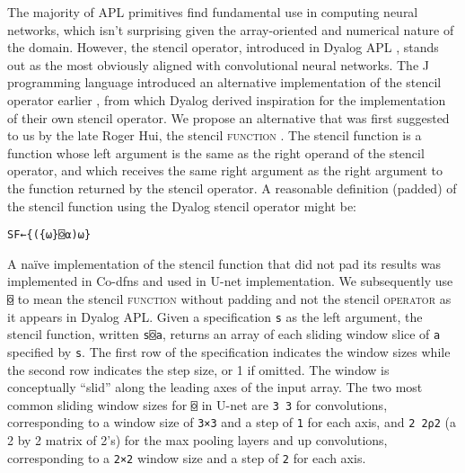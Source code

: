 \documentclass[10pt,twocolumn,english,format=sigplan,screen,balance]{acmart}
\newcommand{\noun}[1]{\textsc{#1}}
\begin{document}
The majority of APL primitives find fundamental use in computing neural
networks, which isn't surprising given the array-oriented and numerical
nature of the domain. However, the stencil operator, introduced in
Dyalog APL \citep{stencil-lives}, stands out as the most obviously
aligned with convolutional neural networks. The J programming language
introduced an alternative implementation of the stencil operator earlier
\citep{stencil-in-J}, from which Dyalog derived inspiration for the
implementation of their own stencil operator. We propose an alternative
that was first suggested to us by the late Roger Hui, the stencil
\noun{function} \citep{SF-hui-blog}. The stencil function is a function
whose left argument is the same as the right operand of the stencil
operator, and which receives the same right argument as the right
argument to the function returned by the stencil operator. A reasonable
definition (padded) of the stencil function using the Dyalog stencil
operator might be:
\begin{verbatim}
SF←{({⍵}⌺⍺)⍵}
\end{verbatim}
A naïve implementation of the stencil function that did not pad its
results was implemented in Co-dfns and used in U-net implementation.
We subsequently use \texttt{⌺} to mean the stencil \noun{function}
without padding and not the stencil \noun{operator} as it appears
in Dyalog APL. Given a specification \texttt{s} as the left argument,
the stencil function, written \texttt{s⌺a}, returns an array of each
sliding window slice of \texttt{a} specified by \texttt{s}. The first
row of the specification indicates the window sizes while the second
row indicates the step size, or 1 if omitted. The window is conceptually
“slid” along the leading axes of the input array. The two most
common sliding window sizes for \texttt{⌺} in U-net are \texttt{3
3} for convolutions, corresponding to a window size of \texttt{3×3}
and a step of \texttt{1} for each axis, and \texttt{2 2⍴2} (a 2 by
2 matrix of 2's) for the max pooling layers and up convolutions, corresponding
to a \texttt{2×2} window size and a step of \texttt{2} for each axis.
\end{document}
